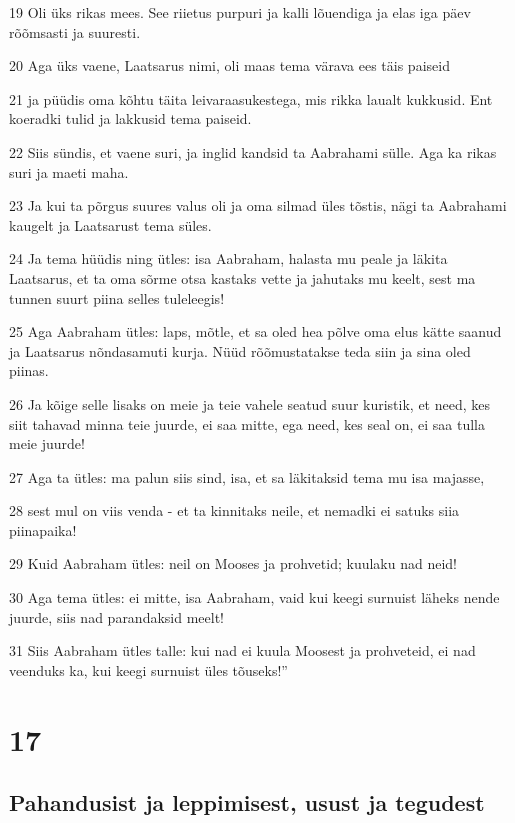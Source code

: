 \par 19 Oli üks rikas mees. See riietus purpuri ja kalli lõuendiga ja elas iga päev rõõmsasti ja suuresti.
\par 20 Aga üks vaene, Laatsarus nimi, oli maas tema värava ees täis paiseid
\par 21 ja püüdis oma kõhtu täita leivaraasukestega, mis rikka laualt kukkusid. Ent koeradki tulid ja lakkusid tema paiseid.
\par 22 Siis sündis, et vaene suri, ja inglid kandsid ta Aabrahami sülle. Aga ka rikas suri ja maeti maha.
\par 23 Ja kui ta põrgus suures valus oli ja oma silmad üles tõstis, nägi ta Aabrahami kaugelt ja Laatsarust tema süles.
\par 24 Ja tema hüüdis ning ütles: isa Aabraham, halasta mu peale ja läkita Laatsarus, et ta oma sõrme otsa kastaks vette ja jahutaks mu keelt, sest ma tunnen suurt piina selles tuleleegis!
\par 25 Aga Aabraham ütles: laps, mõtle, et sa oled hea põlve oma elus kätte saanud ja Laatsarus nõndasamuti kurja. Nüüd rõõmustatakse teda siin ja sina oled piinas.
\par 26 Ja kõige selle lisaks on meie ja teie vahele seatud suur kuristik, et need, kes siit tahavad minna teie juurde, ei saa mitte, ega need, kes seal on, ei saa tulla meie juurde!
\par 27 Aga ta ütles: ma palun siis sind, isa, et sa läkitaksid tema mu isa majasse,
\par 28 sest mul on viis venda - et ta kinnitaks neile, et nemadki ei satuks siia piinapaika!
\par 29 Kuid Aabraham ütles: neil on Mooses ja prohvetid; kuulaku nad neid!
\par 30 Aga tema ütles: ei mitte, isa Aabraham, vaid kui keegi surnuist läheks nende juurde, siis nad parandaksid meelt!
\par 31 Siis Aabraham ütles talle: kui nad ei kuula Moosest ja prohveteid, ei nad veenduks ka, kui keegi surnuist üles tõuseks!”


\chapter{17}

\section*{Pahandusist ja leppimisest, usust ja tegudest}

